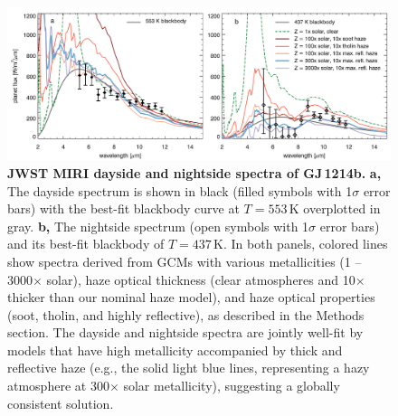 \documentclass[pdflatex,sn-standardnature]{sn-jnl}%
\begin{document}


% 

\begin{figure}[t]
    \centering
    \includegraphics[width=1.0\textwidth]{GJ1214_fp_day_night.pdf}
    \caption{\textbf{JWST MIRI dayside and nightside spectra of GJ\,1214b.} \textbf{a,} The dayside spectrum is shown in black (filled symbols with 1$\sigma$ error bars) with the best-fit blackbody curve at $T = 553$\,K overplotted in gray.  \textbf{b,} The nightside spectrum (open symbols with 1$\sigma$ error bars) and its best-fit blackbody of $T = 437$\,K.  In both panels, colored lines show spectra derived from GCMs with various metallicities (1 -- 3000$\times$ solar), haze optical thickness (clear atmospheres and 10$\times$ thicker than our nominal haze model), and haze optical properties (soot, tholin, and highly reflective), as described in the Methods section.  The dayside and nightside spectra are jointly well-fit by models that have high metallicity accompanied by thick and reflective haze (e.g., the solid light blue lines, representing a hazy atmosphere at 300$\times$ solar metallicity), suggesting a globally consistent solution.}
    \label{fig:fp_day_night} 
\end{figure}
\end{document}
